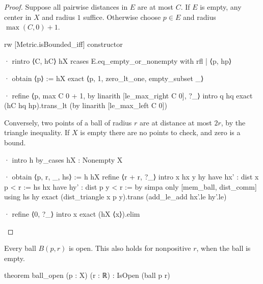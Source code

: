 \begin{proof}
  Suppose all pairwise distances in $E$ are at most $C$.
  If $E$ is empty, any center in $X$ and radius $1$ suffice.
  Otherwise choose $p\in E$ and radius $\max(C,0)+1$.

  \begin{lean}
    rw [Metric.isBounded_iff]
    constructor

    · rintro ⟨C, hC⟩ hX
      rcases E.eq_empty_or_nonempty with rfl | ⟨p, hp⟩

      · obtain ⟨p⟩ := hX
        exact ⟨p, 1, zero_lt_one, empty_subset _⟩

      · refine ⟨p, max C 0 + 1, by linarith [le_max_right C 0], ?_⟩
        intro q hq
        exact (hC hq hp).trans_lt (by linarith [le_max_left C 0])
  \end{lean}

  Conversely, two points of a ball of radius $r$ are at distance at most $2r$, by the triangle
  inequality.
  If $X$ is empty there are no points to check, and zero is a bound.

  \begin{lean}
    · intro h
      by_cases hX : Nonempty X

      · obtain ⟨p, r, _, hs⟩ := h hX
        refine ⟨r + r, ?_⟩
        intro x hx y hy
        have hx' : dist x p < r := hs hx
        have hy' : dist p y < r := by simpa only [mem_ball, dist_comm] using hs hy
        exact (dist_triangle x p y).trans (add_le_add hx'.le hy'.le)

      · refine ⟨0, ?_⟩
        intro x
        exact (hX ⟨x⟩).elim
  \end{lean}
\end{proof}

\begin{proposition}
  \label{an1:thm:neighborhood-is-open}
  Every ball $B(p,r)$ is open.
  This also holds for nonpositive $r$, when the ball is empty.

  \begin{lean}
    theorem ball_open (p : X) (r : ℝ) : IsOpen (ball p r)
  \end{lean}
\end{proposition}

